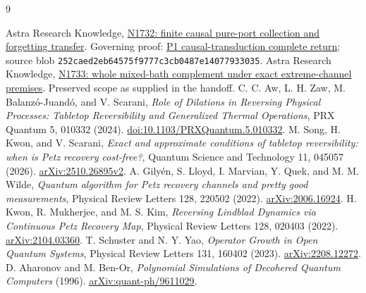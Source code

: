 \documentclass[11pt,a4paper]{article}
\begin{document}
\clearpage
\begin{thebibliography}{9}
\small\raggedright
{} Astra Research Knowledge, \href{https://github.com/harjassand/astra-research-knowledge/blob/main/knowledge/current/packets/N1732.json}{N1732: finite causal pure-port collection and forgetting transfer}. Governing proof: \href{https://github.com/harjassand/astra-research-knowledge/blob/main/research/2026-11-04-causal-state-interface-constructions/source/P1_CAUSAL_TRANSDUCTION_COMPLETE_RETURN.txt}{P1 causal-transduction complete return}; source blob \texttt{252caed2eb64575f9777c3cb0487e14077933035}.
 Astra Research Knowledge, \href{https://github.com/harjassand/astra-research-knowledge/blob/main/knowledge/current/packets/N1733.json}{N1733: whole mixed-bath complement under exact extreme-channel premises}. Preserved scope as supplied in the handoff.
 C. C. Aw, L. H. Zaw, M. Balanz\'{o}-Juand\'{o}, and V. Scarani, \emph{Role of Dilations in Reversing Physical Processes: Tabletop Reversibility and Generalized Thermal Operations}, PRX Quantum 5, 010332 (2024). \href{https://doi.org/10.1103/PRXQuantum.5.010332}{doi:10.1103/PRXQuantum.5.010332}.
 M. Song, H. Kwon, and V. Scarani, \emph{Exact and approximate conditions of tabletop reversibility: when is Petz recovery cost-free?}, Quantum Science and Technology 11, 045057 (2026). \href{https://arxiv.org/html/2510.26895v2}{arXiv:2510.26895v2}.
 A. Gily\'{e}n, S. Lloyd, I. Marvian, Y. Quek, and M. M. Wilde, \emph{Quantum algorithm for Petz recovery channels and pretty good measurements}, Physical Review Letters 128, 220502 (2022). \href{https://arxiv.org/abs/2006.16924}{arXiv:2006.16924}.
 H. Kwon, R. Mukherjee, and M. S. Kim, \emph{Reversing Lindblad Dynamics via Continuous Petz Recovery Map}, Physical Review Letters 128, 020403 (2022). \href{https://arxiv.org/abs/2104.03360}{arXiv:2104.03360}.
 T. Schuster and N. Y. Yao, \emph{Operator Growth in Open Quantum Systems}, Physical Review Letters 131, 160402 (2023). \href{https://arxiv.org/abs/2208.12272}{arXiv:2208.12272}.
 D. Aharonov and M. Ben-Or, \emph{Polynomial Simulations of Decohered Quantum Computers} (1996). \href{https://arxiv.org/abs/quant-ph/9611029}{arXiv:quant-ph/9611029}.
\end{thebibliography}
\end{document}

